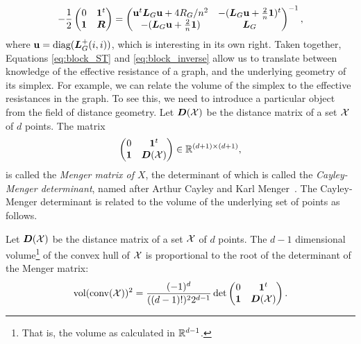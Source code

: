 \begin{equation}
\label{eq:block_inverse}
-\frac{1}{2}\begin{pmatrix}
0 & \vb{1}^t \\
\vb{1} & \vb*{R}
\end{pmatrix} = 
\begin{pmatrix}
\vb{u}^t  \vb*{L}_G \vb{u}  + 4R_G/n^2
&  -(\vb*{L}_G\vb{u} + \frac{2}{n}\vb{1} )^t \\
-(\vb*{L}_G\vb{u} + \frac{2}{n}\vb{1} ) 
& \vb*{L}_G
\end{pmatrix}^{-1},
\end{equation}
where $\vb{u}=\text{diag}(\vb*{L}_G^+(i,i))$, which is interesting in its own right. Taken together, Equations \eqref{eq:block_ST} and \eqref{eq:block_inverse} allow us to translate between knowledge of the effective resistance of a graph, and the underlying geometry of its simplex. For example, we can relate the volume of the simplex to the effective resistances in the graph. To see this, we need to introduce a particular object from the field of distance geometry. Let $\vb*{D}(\mathcal{X})$ be the distance matrix of a set $\mathcal{X}$ of $d$ points. The matrix 
\begin{equation}
\label{eq:menger_matrix}
\begin{pmatrix}
0 & \vb{1}^t \\
\vb{1} & \vb*{D}(\mathcal{X})
\end{pmatrix}\in\mathbb{R}^{(d+1)\times (d+1)},
\end{equation}
is called the \emph{Menger matrix of $X$}, the determinant of which is called the \emph{Cayley-Menger determinant}, named after Arthur Cayley and Karl Menger~\cite{cayley1841theorem, Menger1928}. The Cayley-Menger determinant is related to the volume of the underlying set of points as follows. 


\begin{lemma}
	\label{lem:menger_volume}
	Let $\vb*{D}(\mathcal{X})$ be the distance matrix of a set $\mathcal{X}$ of $d$ points. The $d-1$ dimensional volume\footnote{That is, the volume as calculated in $\mathbb{R}^{d-1}$.} of the convex hull of $\mathcal{X}$ is proportional to the root of the determinant of the Menger matrix: 
	\begin{equation*}
	\textnormal{vol}(\textnormal{conv}(\mathcal{X}))^2 = \frac{(-1)^d}{((d-1)!)^2 2^{d-1}} \det\begin{pmatrix}
	0 & \vb{1}^t \\
	\vb{1} & \vb*{D}(\mathcal{X})
	\end{pmatrix}.
	\end{equation*} 
\end{lemma}


